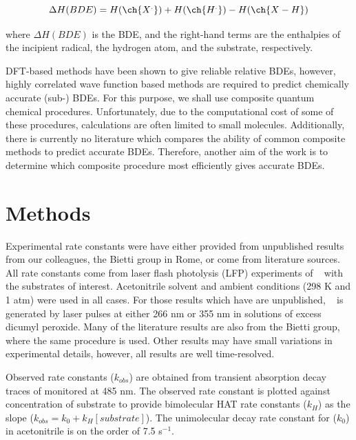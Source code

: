 \begin{equation}
  \Delta H(BDE) =  H(\ch{X^.}) + H(\ch{H^.}) - H(\ch{X-H})
\end{equation}

\noindent where $\Delta H(BDE)$ is the BDE, and the right-hand terms are the enthalpies of the incipient radical, the hydrogen atom, and the substrate, respectively.

DFT-based methods have been shown to give reliable relative BDEs, however, highly correlated wave function based methods are required to predict chemically accurate (sub-\kcalmol) BDEs.\cite{DiLabio1999, Chan2012, Wiberg2014} For this purpose, we shall use composite quantum chemical procedures. Unfortunately, due to the computational cost of some of these procedures, calculations are often limited to small molecules. Additionally, there is currently no literature which compares the ability of common composite methods to predict accurate BDEs. Therefore, another aim of the work is to determine which composite procedure most efficiently gives accurate BDEs.

\section{Methods}

Experimental rate constants were have either provided from unpublished results from our colleagues, the Bietti group in Rome, or come from literature sources.\cite{Bietti2010, Bietti2011, Pischel2001, Salamone2011, Salamone2012, Salamone2012a, Salamone2013, Salamone2015} All rate constants come from laser flash photolysis (LFP) experiments of \cumo~ with the substrates of interest. Acetonitrile solvent and ambient conditions (298 K and 1 atm) were used in all cases. For those results which have are unpublished, \cumo~ is generated by laser pulses at either 266 nm or 355 nm in solutions of excess dicumyl peroxide. Many of the literature results are also from the Bietti group, where the same procedure is used. Other results may have small variations in experimental details, however, all results are well time-resolved.

Observed rate constants ($k_{obs}$) are obtained from transient absorption decay traces of \cumo monitored at 485 nm. The observed rate constant is plotted against concentration of substrate to provide bimolecular HAT rate constants ($k_H$) as the slope ($k_{obs} = k_0 + k_H[substrate]$). The unimolecular decay rate constant for \cumo ($k_0$) in acetonitrile is on the order of 7.5  s$^{-1}$.\cite{Avila1995}

